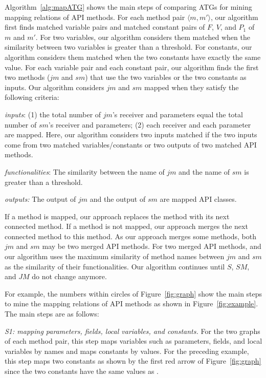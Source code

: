 Algorithm~\ref{alg:mapATG} shows the main steps of comparing ATGs
for mining mapping relations of API methods. For each method pair
$\langle m, m'\rangle$, our algorithm first finds matched variable
pairs and matched constant pairs of $F$, $V$, and $P_1$ of $m$ and
$m'$. For two variables, our algorithm considers them matched when
the similarity between two variables is greater than a threshold.
For constants, our algorithm considers them matched when the two
constants have exactly the same value. For each variable pair and
each constant pair, our algorithm finds the first two methods ($jm$
and $sm$) that use the two variables or the two constants as inputs.
Our algorithm considers $jm$ and $sm$ mapped when they satisfy the
following criteria:

\emph{inputs}: (1) the total number of $jm$'s receiver and
parameters equal the total number of $sm$'s receiver and parameters;
(2) each receiver and each parameter are mapped. Here, our algorithm
considers two inputs matched if the two inputs come from two matched
variables/constants or two outputs of two matched API methods.

\emph{functionalities}: The similarity between the name of $jm$ and
the name of $sm$ is greater than a threshold.

\emph{outputs:} The output of $jm$ and the output of $sm$ are mapped
API classes.

If a method is mapped, our approach replaces the method with its
next connected method. If a method is not mapped, our approach
merges the next connected method to this method. As our approach
merges some methods, both $jm$ and $sm$ may be two merged API
methods. For two merged API methods, and our algorithm uses the
maximum similarity of method names between $jm$ and $sm$ as the
similarity of their functionalities. Our algorithm continues until
$S$, $SM$, and $JM$ do not change anymore.


For example, the numbers within circles of Figure~\ref{fig:graph}
show the main steps to mine the mapping relations of API methods as
shown in Figure~\ref{fig:example}. The main steps are as follows:

\emph{S1: mapping parameters, fields, local variables, and
constants.} For the two graphs of each method pair, this step maps
variables such as parameters, fields, and local variables by names
and maps constants by values. For the preceding example, this step
maps two constants as shown by the first red arrow of
Figure~\ref{fig:graph} since the two constants have the same values
as .

